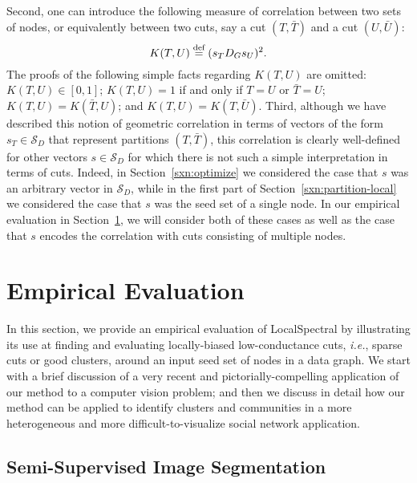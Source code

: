 \documentclass[11pt]{article}
\newcommand{\defeq}{\stackrel{\textup{def}}{=}}
\begin{document}
Second, one can introduce the following measure of correlation between two 
sets of nodes, or equivalently between two cuts, say a cut $(T, \bar{T})$ 
and a cut $(U, \bar{U})$:
$$
K(T,U) \defeq ( s_T D_G s_U )^2 .
$$
The proofs of the following simple facts regarding $K(T,U)$ are omitted:
$K(T,U) \in [0,1]$;
$K(T,U) = 1$ if and only if $T=U$ or $\bar{T}=U$;
$K(T,U) = K(\bar{T}, U)$; and
$K(T,U) = K(T, \bar{U})$.
Third, although we have described this notion of geometric correlation in 
terms of vectors of the form $s_T \in \mathcal{S}_{D}$ that represent 
partitions $(T,\bar{T})$, this correlation is clearly well-defined for other 
vectors $s \in \mathcal{S}_{D}$ for which there is not such a simple 
interpretation in terms of cuts.
Indeed, in Section~\ref{sxn:optimize} we considered the case that $s$ was 
an arbitrary vector in $\mathcal{S}_{D}$, while in the first part of 
Section~\ref{sxn:partition-local} we considered the case that $s$ was the 
seed set of a single node.
In our empirical evaluation in Section~\ref{sxn:empirical}, we will 
consider both of these cases as well as the case that $s$ encodes the 
correlation with cuts consisting of multiple nodes.


\section{Empirical Evaluation}
\label{sxn:empirical} 

In this section, we provide an empirical evaluation of \textsf{LocalSpectral} 
by illustrating its use at finding and evaluating locally-biased 
low-conductance cuts, \emph{i.e.}, sparse cuts or good clusters, around an input seed set of nodes in 
a data graph.
We start with a brief discussion of a very recent and pictorially-compelling 
application of our method to a computer vision problem; and then we discuss 
in detail how our method can be applied to identify clusters and communities 
in a more heterogeneous and more difficult-to-visualize social network 
application.

\subsection{Semi-Supervised Image Segmentation}
\end{document}
